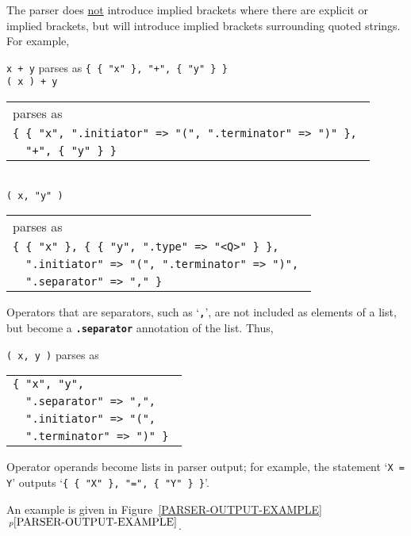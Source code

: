 \documentclass[12pt]{article}
\newcommand{\TT}[1]{{\tt \bfseries #1}}
\newcommand{\ttkey}[1]{{\tt \bfseries #1}}
\newcommand{\pagnote}[1]{$\,^{p\pageref{#1}}$}
\newenvironment{indpar}[1][0.3in]%
	{\begin{list}{}%
		     {\setlength{\itemsep}{0in}%
		      \setlength{\topsep}{0in}%
		      \setlength{\parsep}{1ex}%
		      \setlength{\labelwidth}{#1}%
		      \setlength{\leftmargin}{#1}%
		      \addtolength{\leftmargin}{\labelsep}}%
	 \item}%
	{\end{list}}
\begin{document}
The parser does \underline{not} introduce implied brackets where there
are explicit or implied brackets, but will introduce implied brackets
surrounding quoted strings.  For example,
\begin{indpar}
{\tt x + y} parses as {\tt \{ \{ "x" \}, "+", \{ "y" \} \}} \\
{\tt ( x ) + y} \begin{tabular}[t]{@{}l@{}}
		parses as \\
                \tt \{ \{ "x", ".initiator" => "(", ".terminator" => ")" \}, \\
		\tt ~~"+", \{ "y" \} \} \\
                \end{tabular} \\
{\tt ( x, "y" )} \begin{tabular}[t]{@{}l@{}}
		parses as \\
                \tt \{ \{ "x" \}, \{ \{ "y", ".type" => "<Q>" \} \}, \\
		\tt ~~".initiator" => "(", ".terminator" => ")", \\
		\tt ~~".separator" => "," \} \\
                \end{tabular}
\end{indpar}

Operators that are separators, such as `\TT{,}', are not included as elements
of a list, but become a \ttkey{.separator} annotation of the list.  Thus,
\begin{indpar}
{\tt ( x, y )} parses as \begin{tabular}[t]{@{}l@{}}
                \tt \{ "x", "y", \\
		\tt ~~".separator" => ",", \\
		\tt ~~".initiator" => "(", \\
		\tt ~~".terminator" => ")" \} \\
                \end{tabular}
\end{indpar}

Operator operands become lists in parser output;
for example, the statement `{\tt X = Y}' outputs
`{\tt \{ \{ "X" \}, "=", \{ "Y" \} \}}'.

An example is given in Figure~\ref{PARSER-OUTPUT-EXAMPLE}%
\pagnote{PARSER-OUTPUT-EXAMPLE}.
\end{document}
